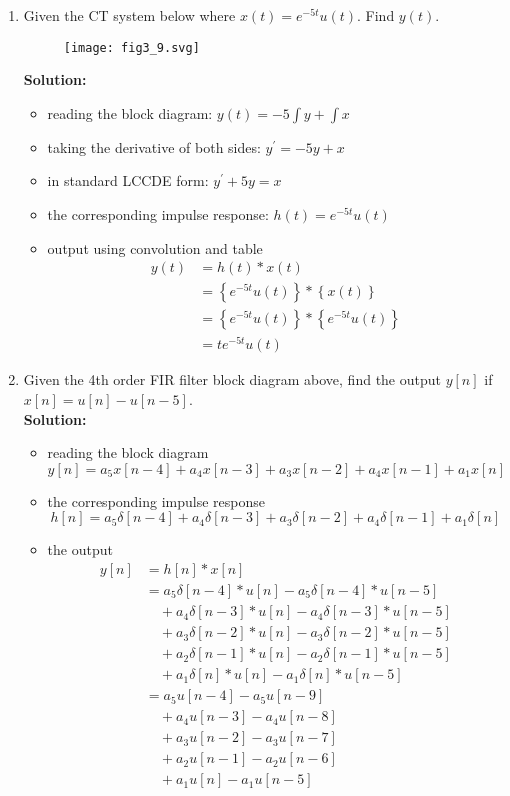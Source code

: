 \documentclass{article}
\begin{document}
\begin{enumerate}
\item
  Given the CT system below where $x(t) = e^{-5t}u(t)$. Find $y(t)$.

  \begin{figure}
  \centering
  \texttt{[image: fig3\_9.svg]}
  \end{figure}

  \textbf{Solution:}
  \begin{itemize}
  \item reading the block diagram: $y(t) = -5\int y + \int x$
  \item taking the derivative of both sides: $y^\prime = -5y + x$
  \item in standard LCCDE form: $y^\prime + 5y = x$
  \item the corresponding impulse response: $h(t) = e^{-5t}u(t)$
  \item output using convolution and table
    \begin{align}
      y(t) &= h(t) * x(t)\\
      &=\left\{ e^{-5t}u(t) \right\}*\left\{ x(t) \right\}\\
      &=\left\{ e^{-5t}u(t) \right\}*\left\{ e^{-5t}u(t) \right\}\\
      &= te^{-5t}u(t)
    \end{align}
  \end{itemize}

\item
  Given the 4th order FIR filter block diagram above, find the output $y[n]$ if $x[n] = u[n] - u[n-5]$.\\
  \textbf{Solution:}
  \begin{itemize}
  \item reading the block diagram
    \[
    y[n] = a_5 x[n-4] + a_4 x[n-3] + a_3 x[n-2] + a_4 x[n-1] + a_1 x[n]
    \]
  \item the corresponding impulse response
    \[
    h[n] = a_5 \delta[n-4] + a_4 \delta[n-3] + a_3 \delta[n-2] + a_4 \delta[n-1] + a_1 \delta[n]
    \]
  \item the output
    \begin{align}
      y[n] &= h[n]*x[n]\\
      &= a_5\delta[n-4]*u[n] - a_5\delta[n-4]*u[n-5]\\
      &\quad + a_4\delta[n-3]*u[n] - a_4\delta[n-3]*u[n-5]\\
      &\quad + a_3\delta[n-2]*u[n] - a_3\delta[n-2]*u[n-5]\\
      &\quad + a_2\delta[n-1]*u[n] - a_2\delta[n-1]*u[n-5]\\
      &\quad + a_1\delta[n]*u[n] - a_1\delta[n]*u[n-5]\\
      &= a_5u[n-4] - a_5u[n-9]\\
      &\quad + a_4u[n-3] - a_4u[n-8]\\
      &\quad + a_3u[n-2] - a_3u[n-7]\\
      &\quad + a_2u[n-1] - a_2u[n-6]\\
      &\quad + a_1u[n] - a_1u[n-5]\\
    \end{align}

  \end{itemize}
  
\end{enumerate}
\end{document}
